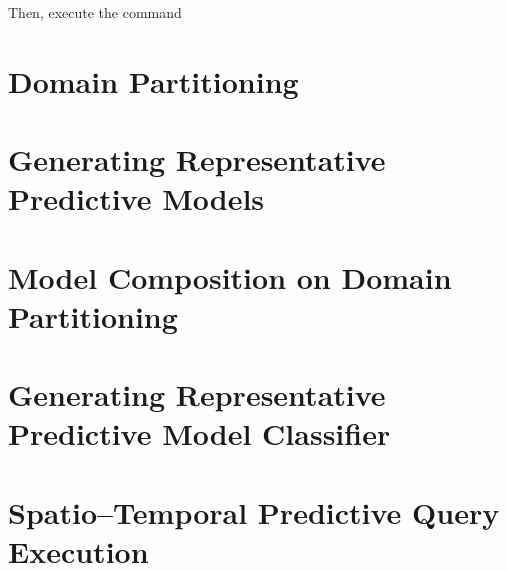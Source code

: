 Then, execute the command 

\section{Domain Partitioning}
\label{ap:domain_partititonig}



\section{Generating Representative Predictive Models}


\section{Model Composition on Domain Partitioning}


\section{Generating Representative Predictive Model Classifier}


\section{Spatio--Temporal Predictive Query Execution}

